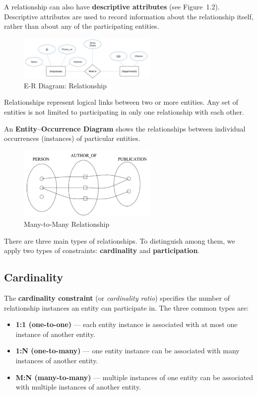 A relationship can also have \textbf{descriptive attributes} (see Figure~1.2). Descriptive attributes are used to record information about the relationship itself, rather than about any of the participating entities.  

\begin{figure}[H]
  \centering
  \includegraphics[width=0.6\textwidth]{Figure/ER2.pdf}
  \caption{E-R Diagram: Relationship}
\end{figure}

Relationships represent logical links between two or more entities. Any set of entities is not limited to participating in only one relationship with each other.  

An \textbf{Entity–Occurrence Diagram} shows the relationships between individual occurrences (instances) of particular entities.  

\begin{figure}[H]
  \centering
  \includegraphics[width=0.6\textwidth]{Figure/ER3.pdf}
  \caption{Many-to-Many Relationship}
\end{figure}

There are three main types of relationships. To distinguish among them, we apply two types of constraints: \textbf{cardinality} and \textbf{participation}.  

\subsection{Cardinality}

The \textbf{cardinality constraint} (or \emph{cardinality ratio}) specifies the number of relationship instances an entity can participate in. The three common types are:
\begin{itemize}
  \item \textbf{1:1 (one-to-one)} — each entity instance is associated with at most one instance of another entity.
  \item \textbf{1:N (one-to-many)} — one entity instance can be associated with many instances of another entity.
  \item \textbf{M:N (many-to-many)} — multiple instances of one entity can be associated with multiple instances of another entity.
\end{itemize}

